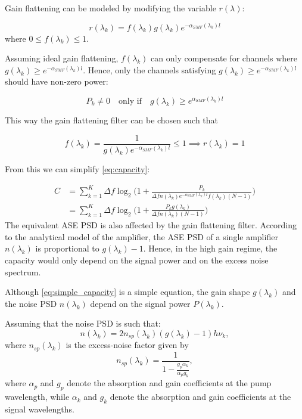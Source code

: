 \documentclass[a4paper]{article}
\begin{document}
Gain flattening can be modeled by modifying the variable $r(\lambda)$:

\begin{equation}
	r(\lambda_k) = f(\lambda_k)g(\lambda_k)e^{-\alpha_{SMF}(\lambda_k)l}
\end{equation}
where $0\leq f(\lambda_k) \leq 1$. 

Assuming ideal gain flattening, $f(\lambda_k)$ can only compensate for channels where $g(\lambda_k) \geq e^{-\alpha_{SMF}(\lambda_k)l}$. Hence, only the channels satisfying $g(\lambda_k) \geq e^{-\alpha_{SMF}(\lambda_k)l}$ should have non-zero power:

\begin{equation}
	P_k \neq 0 \quad\text{only if}\quad g(\lambda_k) \geq e^{\alpha_{SMF}(\lambda_k)l}
\end{equation}

This way the gain flattening filter can be chosen such that

\begin{equation}
	f(\lambda_k) = \frac{1}{g(\lambda_k)e^{-\alpha_{SMF}(\lambda_k)l}} \leq 1 \implies r(\lambda_k) = 1
\end{equation}

From this we can simplify \eqref{eq:capacity}:

\begin{align}
	C &= \sum_{k = 1}^{K} \Delta f\log_2\bigg(1 + \frac{P_k}{\Delta fn(\lambda_k)e^{-\alpha_{SMF}(\lambda_k)l}f(\lambda_k)(N-1)}\bigg) \\
	&=\sum_{k = 1}^{K} \Delta f\log_2\bigg(1 + \frac{P_kg(\lambda_k)}{\Delta fn(\lambda_k)(N-1)}\bigg) \label{eq:simple_capacity}
\end{align}
The equivalent ASE PSD is also affected by the gain flattening filter. According to the analytical model of the amplifier, the ASE PSD of a single amplifier $n(\lambda_k)$ is proportional to $g(\lambda_k)-1$. Hence, in the high gain regime, the capacity would only depend on the signal power and on the excess noise spectrum.

Although  \eqref{eq:simple_capacity} is a simple equation, the gain shape $g(\lambda_k)$ and the noise PSD $n(\lambda_k)$ depend on the signal power $P(\lambda_k)$.

Assuming that the noise PSD is such that:
\begin{equation}
	n(\lambda_k) = 2n_{sp}(\lambda_k)(g(\lambda_k) - 1)h\nu_k,
\end{equation}
where $n_{sp}(\lambda_k)$ is the excess-noise factor given by
\begin{equation} \label{eq:excess_noise}
	n_{sp}(\lambda_k) = \frac{1}{1 - \frac{g_p\alpha_k}{\alpha_pg_k}},
\end{equation}
where $\alpha_p$ and $g_p$ denote the absorption and gain coefficients at the pump wavelength, while  $\alpha_k$ and $g_k$ denote the absorption and gain coefficients at the signal wavelengths. 
\end{document}
